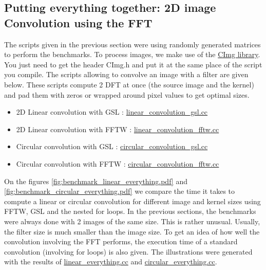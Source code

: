 \documentclass[a4paper,10pt,twoside]{article}
\begin{document}
\subsection{Putting everything together: 2D image Convolution using the FFT}

The scripts given in the previous section were using randomly generated matrices to perform the benchmarks. To process images, we make use of the \href{http://cimg.sourceforge.net/}{CImg library}. You just need to get the header CImg.h and put it at the same place of the script you compile. The scripts allowing to convolve an image with a filter are given below. These scripts compute 2 DFT at once (the source image and the kernel) and pad them with zeros or wrapped around pixel values to get optimal sizes.
\begin{itemize}
\item 2D Linear convolution with GSL : \href{http://jeremy.fix.Free.Fr/Software/Convolution/linear_convolution_gsl.cc}{linear\_convolution\_gsl.cc}
\item 2D Linear convolution with FFTW : \href{http://jeremy.fix.Free.Fr/Software/Convolution/linear_convolution_gsl.cc"}{linear\_convolution\_fftw.cc}
\item Circular convolution with GSL : \href{http://jeremy.fix.Free.Fr/Software/Convolution/circular_convolution_gsl.cc"}{circular\_convolution\_gsl.cc}
\item Circular convolution with FFTW : \href{http://jeremy.fix.Free.Fr/Software/Convolution/circular_convolution_gsl.cc"}{circular\_convolution\_fftw.cc}
\end{itemize}

On the figures \ref{fig:benchmark_linear_everything.pdf} and \ref{fig:benchmark_circular_everything.pdf} we compare the time it takes to compute a linear or circular convolution for different image and kernel sizes using FFTW, GSL and the nested for loops. In the previous sections, the benchmarks were always done with 2 images of the same size. This is rather unusual. Usually, the filter size is much smaller than the image size. To get an idea of how well the convolution involving the FFT performs, the execution time of a standard convolution (involving for loops) is also given. The illustrations were generated with the results of \href{http://jeremy.fix.Free.Fr/Software/Convolution/linear_everything.cc}{linear\_everything.cc} and \href{http://jeremy.fix.Free.Fr/Software/Convolution/circular_everything.cc}{circular\_everything.cc}.
\end{document}
